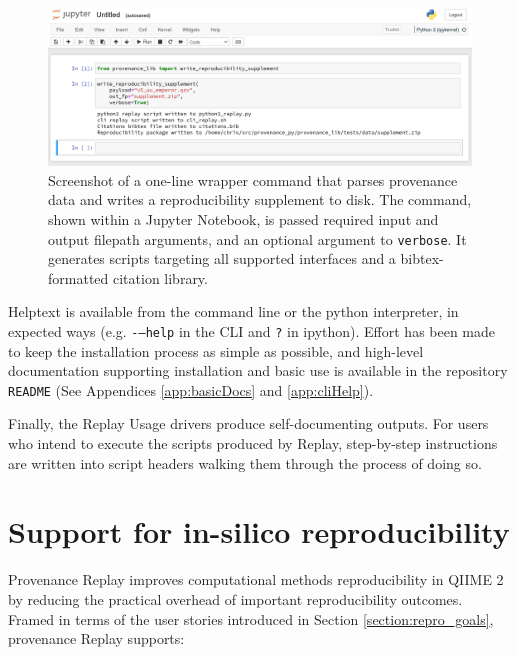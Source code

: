 \begin{figure}[htp]
\centering
\includegraphics[width=\textwidth]{figures/supplement_replay_jn.png}
\caption[Screenshot of a simple Python 3 replay command]%
{Screenshot of a one-line wrapper command that parses provenance data and
writes a reproducibility supplement to disk. The command, shown within a
Jupyter Notebook, is passed required input and output filepath arguments, and
an optional argument to \texttt{verbose}. It generates scripts targeting all
supported interfaces and a bibtex-formatted citation library.}
\label{fig:simple_py_command}
\end{figure}

Helptext is available from the command line or the python interpreter, in
expected ways (e.g. \texttt{-–help} in the CLI and \texttt{?} in ipython).
Effort has been made to keep the installation process as simple as possible, and
high-level documentation supporting installation and basic use is available in
the repository \texttt{README} (See Appendices \ref{app:basicDocs} and
\ref{app:cliHelp}).

Finally, the Replay Usage drivers produce self-documenting outputs. For users
who intend to execute the scripts produced by Replay, step-by-step instructions
are written into script headers walking them through the process of doing so.


\section{Support for in-silico reproducibility}

Provenance Replay improves computational methods reproducibility in QIIME 2 by
reducing the practical overhead of important reproducibility outcomes. Framed in
terms of the user stories introduced in Section \ref{section:repro_goals},
provenance Replay supports:

